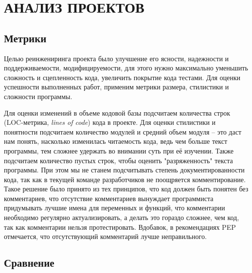\section{АНАЛИЗ ПРОЕКТОВ}
    \subsection{Метрики}
    Целью реинжениринга проекта было улучшение его ясности, надежности и поддерживаемости,
    модифицируемости, для этого нужно максимально уменьшить сложность и сцепленность кода,
    увеличить покрытие кода тестами.
    Для оценки успешности выполненных работ, применим метрики размера,
    стилистики и сложности программы.
    \cite{metrics.cmcons}

    Для оценки изменений в объеме кодовой базы подсчитаем количества строк
    (LOC-метрика, \textit{lines of code}) кода в проекте.
    Для оценки стилистики и понятности подсчитаем количество модулей и средний
    объем модуля -- это даст нам понять, насколько изменилась читаемость кода,
    ведь чем больше текст программы, тем сложнее удержать во внимании суть при её
    изучении. Также подсчитаем количество пустых строк, чтобы оценить
    "разряженность" текста программы.
    При этом мы не станем подсчитывать степень документированности кода,
    так как в текущей команде разработчиков не поощряется комментирование.
    Такое решение было принято из тех принципов,
    что код должен быть понятен без комментариев,
    что отсутствие комментариев вынуждает программиста придумывать лучшие имена
    для переменных и функций,
    что комментарии необходимо регулярно актуализировать, а делать это
    гораздо сложнее, чем код, так как комментарии нельзя протестировать.
    Вдобавок, в рекомендациях PEP отмечается, что отсутствующий комментарий лучше неправильного.

    \subsection{Сравнение}
    
